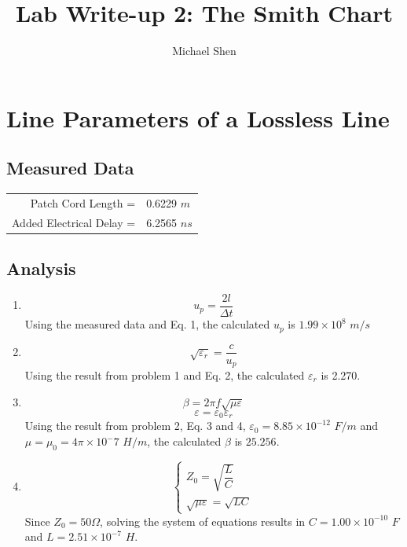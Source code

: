 \documentclass{article}
\begin{document}
\title{Lab Write-up 2: The Smith Chart}
\author{Michael Shen}
\maketitle


\section{Line Parameters of a Lossless Line}

\subsection{Measured Data}

\begin{table}[h]
\centering
	\begin{tabular}{rl}
	Patch Cord Length =  	  & 0.6229 $m$  \\
	Added Electrical Delay =  & 6.2565 $ns$
	\end{tabular}
\end{table}

\subsection{Analysis}

\begin{enumerate}
	\item
		\begin{equation}
			u_p = \dfrac{2l}{\Delta t}
		\end{equation}
		Using the measured data and Eq. 1, the calculated $u_p$ is $1.99\times 10^8$ $m/s$
	\item
		\begin{equation}
			\sqrt{\varepsilon_r} = \dfrac{c}{u_p}
		\end{equation}
		Using the result from problem 1 and Eq. 2, the calculated $\varepsilon_r$ is 2.270.
	\item
		\begin{equation}
			\beta = 2\pi f\sqrt{\mu\varepsilon}
		\end{equation}
		\begin{equation}
			\varepsilon = \varepsilon_0\varepsilon_r
		\end{equation}
		Using the result from problem 2, Eq. 3 and 4, $\varepsilon_0 = 8.85\times 10^{-12}$ $F/m$ and $\mu = \mu_0 = 4\pi\times 10^-7$ $H/m$, the calculated $\beta$ is $25.256$.
	\item
		\begin{equation}
			\begin{cases}
				Z_0 = \sqrt{\dfrac{L}{C}} \\
				\sqrt{\mu\varepsilon} = \sqrt{LC}
			\end{cases}
		\end{equation}
		Since $Z_0 = 50 \Omega$, solving the system of equations results in $C = 1.00\times 10^{-10}$ $F$ and $L = 2.51\times 10^{-7}$ $H$.		
		
\end{enumerate}
\end{document}
